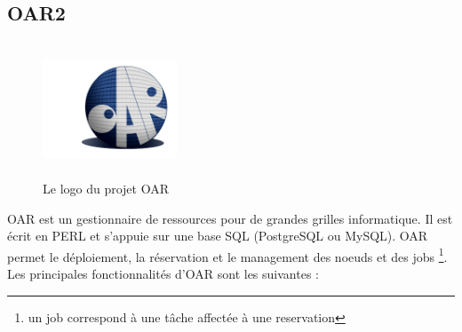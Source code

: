 \documentclass[a4paper, 10pt, onecolumn]{report}
\begin{document}
		\subsection{OAR2}	
		\begin{figure}[!h]
			\centering
   			\includegraphics[width=4cm,height=4cm]{oar_logo.png}
   			\caption{Le logo du projet OAR}
    		\label{fig:oar}
		\end{figure} 		
			OAR est un gestionnaire de ressources pour de grandes grilles informatique. Il est écrit en PERL et s'appuie sur une base SQL (PostgreSQL ou MySQL). OAR permet le déploiement, la réservation  et le management des noeuds et des jobs \footnote{un job correspond à une t\^ache affectée à une reservation}.\\
			Les principales fonctionnalités d'OAR sont les suivantes :  \\
\end{document}
